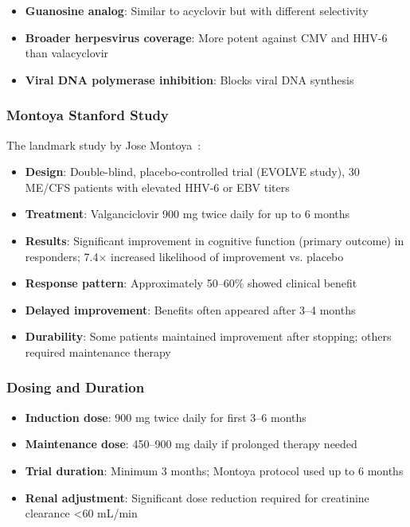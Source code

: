 \begin{itemize}
    \item \textbf{Guanosine analog}: Similar to acyclovir but with different selectivity
    \item \textbf{Broader herpesvirus coverage}: More potent against CMV and HHV-6 than valacyclovir
    \item \textbf{Viral DNA polymerase inhibition}: Blocks viral DNA synthesis
\end{itemize}

\subsubsection{Montoya Stanford Study}

The landmark study by Jose Montoya~\cite{Montoya2013valganciclovir}:

\begin{itemize}
    \item \textbf{Design}: Double-blind, placebo-controlled trial (EVOLVE study), 30 ME/CFS patients with elevated HHV-6 or EBV titers
    \item \textbf{Treatment}: Valganciclovir 900 mg twice daily for up to 6 months
    \item \textbf{Results}: Significant improvement in cognitive function (primary outcome) in responders; 7.4$\times$ increased likelihood of improvement vs. placebo
    \item \textbf{Response pattern}: Approximately 50--60\% showed clinical benefit
    \item \textbf{Delayed improvement}: Benefits often appeared after 3--4 months
    \item \textbf{Durability}: Some patients maintained improvement after stopping; others required maintenance therapy
\end{itemize}

\subsubsection{Dosing and Duration}

\begin{itemize}
    \item \textbf{Induction dose}: 900 mg twice daily for first 3--6 months
    \item \textbf{Maintenance dose}: 450--900 mg daily if prolonged therapy needed
    \item \textbf{Trial duration}: Minimum 3 months; Montoya protocol used up to 6 months
    \item \textbf{Renal adjustment}: Significant dose reduction required for creatinine clearance <60 mL/min
\end{itemize}

